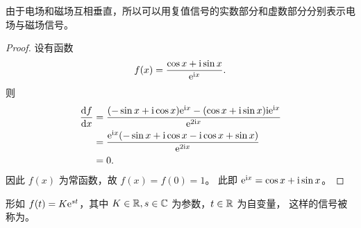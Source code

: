 \begin{example}[复值信号在电磁场中的应用]
    由于电场和磁场互相垂直，所以可以用复值信号的实数部分和虚数部分分别表示电场与磁场信号。
\end{example}

\begin{proof}
     设有函数
    \begin{align*}
        f(x) = \frac{\cos x + \mathrm{i} \sin x}{\mathrm{e}^{\mathrm{i} x}}.
    \end{align*}
    则
    \begin{align*}
        \frac{\mathrm{d}f}{\mathrm{d}x} & = \frac{(-\sin x + \mathrm{i} \cos x)\mathrm{e}^{\mathrm{i} x}
                    - (\cos x + \mathrm{i} \sin x)\mathrm{i} \mathrm{e}^{\mathrm{i} x}}
                    {\mathrm{e}^{2\mathrm{i} x}} \\
        & = \frac{\mathrm{e}^{\mathrm{i} x}(-\sin x + \mathrm{i} \cos x - \mathrm{i} \cos x + \sin x)}{\mathrm{e}^{2\mathrm{i} x}} \\
        & = 0.
    \end{align*}
    因此 $f(x)$ 为常函数，故 $f(x) = f(0) = 1$。
    此即 $\mathrm{e}^{\mathrm{i} x} = \cos x + \mathrm{i} \sin x$。
\end{proof}

\begin{definition}[复指数信号]
    形如 $f(t) = K\mathrm{e}^{st}$，其中 $K \in \mathbb{R}, s \in \mathbb{C}$ 为参数，$t \in \mathbb{R}$ 为自变量，
    这样的信号被称为。
\end{definition}

